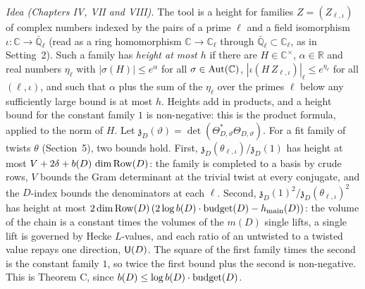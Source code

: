 
\emph{Idea (Chapters IV, VII and VIII).} The tool is a height for families $Z=(Z_{\ell,\iota})$ of complex numbers
indexed by the pairs of a prime $\ell$ and a field isomorphism $\iota\colon\mathbb{C}\to\bar{\mathbb{Q}}_\ell$ (read as a ring homomorphism $\mathbb{C}\to\mathbb{C}_\ell$ through $\bar{\mathbb{Q}}_\ell\subset\mathbb{C}_\ell$, as in Setting~2). Such a
family has \emph{height at most $h$} if there are $H\in\mathbb{C}^\times$, $\alpha\in\mathbb{R}$ and real numbers
$\eta_\ell$ with $|\sigma(H)|\le e^{\alpha}$ for all $\sigma\in\operatorname{Aut}(\mathbb{C})$, $|\iota(H\,Z_{\ell,\iota})|_\ell\le e^{\eta_\ell}$ for
all $(\ell,\iota)$, and such that $\alpha$ plus the sum of the $\eta_\ell$ over the primes $\ell$ below any sufficiently
large bound is at most $h$. Heights add in
products, and a height bound for the constant family $1$ is non-negative: this is the product formula, applied to the
norm of $H$. Let $\mathfrak{z}_D(\vartheta)=\det(\Theta_{D,\vartheta}^{*}\Theta_{D,\vartheta})$. For a fit family of
twists $\theta$ (Section~5), two bounds hold. First, $\mathfrak{z}_D(\theta_{\ell,\iota})/\mathfrak{z}_D(1)$ has height at
most $V+2\delta+b(D)\,\dim\mathrm{Row}(D)$: the family is completed to a basis by crude rows, $V$ bounds the Gram determinant at
the trivial twist at every conjugate, and the $D$-index bounds the denominators at each $\ell$. Second,
$\mathfrak{z}_D(1)^2/\mathfrak{z}_D(\theta_{\ell,\iota})^2$ has height at most
$2\dim\mathrm{Row}(D)\,(2\log b(D)\cdot\mathrm{budget}(D)-h_{\mathrm{main}}(D))$: the volume of the chain is a constant times the volumes of the
$m(D)$ single lifts, a single lift is governed by Hecke $L$-values, and each ratio of an untwisted to a twisted value
repays one direction, $\mathsf{U}(D)$. The square of the first family times the second is the constant family $1$, so
twice the first bound plus the second is non-negative. This is Theorem C, since $b(D)\le\log b(D)\cdot\mathrm{budget}(D)$.


